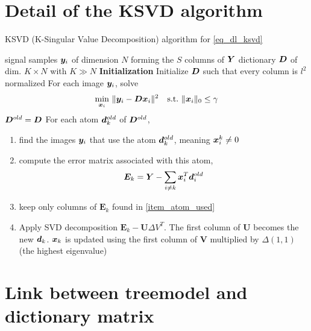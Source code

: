 \section{Detail of the \ac{KSVD} algorithm}\label{sec_ksvd_detail}
\begin{algorithm}
    \caption{\ac{KSVD} (K-Singular Value Decomposition) algorithm for \eqref{eq_dl_ksvd}}\label{alg_ksvd}
  \begin{algorithmic}[1]
    \Input signal samples $\bm{y}_i$ of dimension $N$ forming the $S$ columns of $\bm{Y}$
    \Output dictionary $\bm{D}$ of dim. $K \times N$ with $K \gg N$
    \State \textbf{Initialization} Initialize $\bm{D}$ such that every column is $l^2$ normalized
	\State For each image $\bm{y}_i$, solve \label{alg_ksvd_sparse_coding}
		\begin{align*}
			\quad \min_{\bm{x}_i}~ & \lVert \bm{y}_i-\bm{D}\bm{x}_i\rVert^2 \quad \text{s.t.}~ \lVert \bm{x}_i \rVert_0 \le \gamma
		\end{align*}
	\State $\bm{D}^{old} = \bm{D}$
	\State For each atom $\bm{d}_k^{old}$ of $\bm{D}^{old}$, \label{alg_ksvd_dict_update}
	\begin{enumerate}[leftmargin=15mm,label=(\alph*)]
		\item find the images $\bm{y}_i$ that use the atom $\bm{d}_k^{old}$, meaning $\bm{x}_i^k \ne 0$\label{item_atom_used}
		\item compute the error matrix associated with this atom,
		\begin{align*}
			\bm{E}_k = \bm{Y}-\sum_{i\ne k} \bm{x}_i^T\bm{d}_i^{old}
		\end{align*}
		\item keep only columns of $\bm{E}_k$ found in \cref{item_atom_used}
		\item Apply SVD decomposition $\bm{E}_k - \bm{U} \Delta V^T$. The first column of $\bm{U}$ becomes the new $\bm{d}_k$. $\bm{x}_k$ is updated using the first column of $\bm{V}$ multiplied by $\Delta(1,1)$ (the highest eigenvalue)
	\end{enumerate}
    \EndWhile
  \end{algorithmic}
\end{algorithm}



\FloatBarrier
\section{Link between \gls{treemodel} and dictionary matrix}\label{sec_matrix_vs_tree} 

